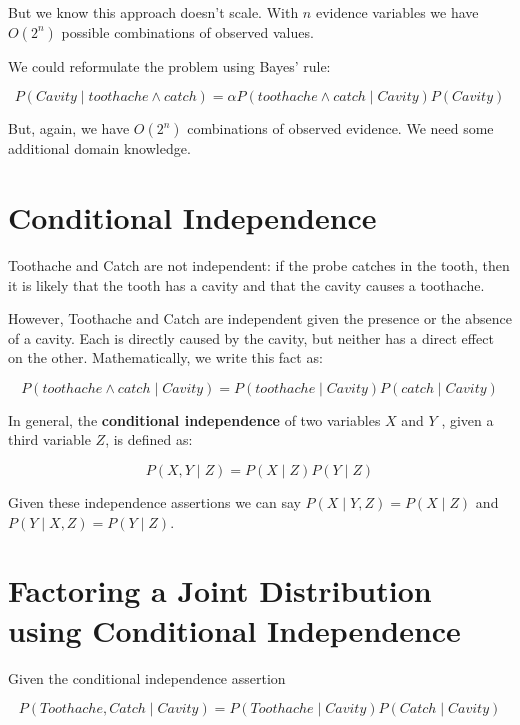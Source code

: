 \documentclass[11pt]{article}
\begin{document}
But we know this approach doesn't scale.  With \(n\) evidence variables we have \(O(2^n)\) possible combinations of observed values.

We could reformulate the problem using Bayes' rule:

\begin{equation*}
P(Cavity  \mid  toothache \land catch) = \alpha P(toothache \land catch  \mid  Cavity) P(Cavity)
\end{equation*}

But, again, we have \(O(2^n)\) combinations of observed evidence.  We need some additional domain knowledge.
\section{Conditional Independence}
\label{sec:org3fad6f6}

Toothache and Catch are not independent: if the probe catches in the tooth, then it is likely that the tooth has a cavity and that the cavity causes a toothache.

However, Toothache and Catch are independent given the presence or the absence of a cavity. Each is directly caused by the cavity, but neither has a direct effect on the other.  Mathematically, we write this fact as:

\begin{equation*}
P(toothache \land catch  \mid  Cavity) = P(toothache  \mid  Cavity) P(catch \mid Cavity)
\end{equation*}

In general, the \textbf{conditional independence} of two variables \(X\) and \(Y\) , given a
third variable \(Z\), is defined as:

\begin{equation*}
P(X,Y  \mid Z) = P(X  \mid Z) P(Y  \mid Z)
\end{equation*}

Given these independence assertions we can say \(P(X  \mid Y,Z) = P(X  \mid Z)\) and \(P(Y  \mid X,Z) = P(Y  \mid Z)\).
\section{Factoring a Joint Distribution using Conditional Independence}
\label{sec:orgcba83e1}

Given the conditional independence assertion

\begin{equation*}
P(Toothache,Catch \mid Cavity) = P(Toothache \mid Cavity) P(Catch \mid Cavity)
\end{equation*}
\end{document}
